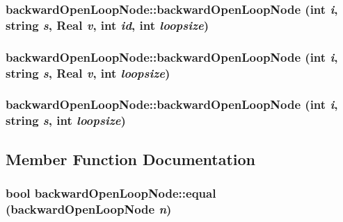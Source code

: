 \subsubsection{\setlength{\rightskip}{0pt plus 5cm}backward\-Open\-Loop\-Node::backward\-Open\-Loop\-Node (int {\em i}, string {\em s}, Real {\em v}, int {\em id}, int {\em loopsize})\hspace{0.3cm}{\tt  [inline]}}\label{classbackwardOpenLoopNode_a853e397e0500b5463ff6d5ecca736de}


\subsubsection{\setlength{\rightskip}{0pt plus 5cm}backward\-Open\-Loop\-Node::backward\-Open\-Loop\-Node (int {\em i}, string {\em s}, Real {\em v}, int {\em loopsize})\hspace{0.3cm}{\tt  [inline]}}\label{classbackwardOpenLoopNode_866a75ebe59eedbaf94c612a0ce37125}


\subsubsection{\setlength{\rightskip}{0pt plus 5cm}backward\-Open\-Loop\-Node::backward\-Open\-Loop\-Node (int {\em i}, string {\em s}, int {\em loopsize})\hspace{0.3cm}{\tt  [inline]}}\label{classbackwardOpenLoopNode_87581e6c6599a83b5e37f4ccc7ec824d}




\subsection{Member Function Documentation}
\subsubsection{\setlength{\rightskip}{0pt plus 5cm}bool backward\-Open\-Loop\-Node::equal ({\bf backward\-Open\-Loop\-Node} {\em n})\hspace{0.3cm}{\tt  [inline]}}\label{classbackwardOpenLoopNode_d7b41d4e386b87a533fbe05608386272}


